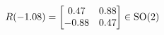 \documentclass[preview]{standalone}
\begin{document}
\begin{align*}
\special{dvisvgm:raw <g id='unique000'>}R(-1.08) = \begin{bmatrix} 0.47 & 0.88 \\ -0.88 & 0.47 \end{bmatrix} \in \text{SO}(2)\special{dvisvgm:raw </g>}
\end{align*}
\end{document}
